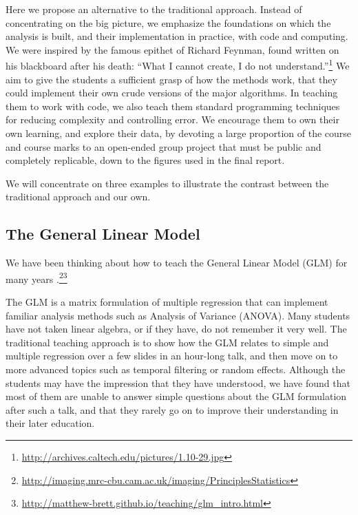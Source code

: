 Here we propose an alternative to the traditional approach.  Instead of
concentrating on the big picture, we emphasize the foundations on which the
analysis is built, and their implementation in practice, with code and
computing.  We were inspired by the famous epithet of Richard Feynman, found
written on his blackboard after his death: ``What I cannot create, I do not
understand.''\footnote{\url{http://archives.caltech.edu/pictures/1.10-29.jpg}}
We aim to give the students a sufficient grasp of how the methods work, that
they could implement their own crude versions of the major algorithms.  In
teaching them to work with code, we also teach them standard programming
techniques for reducing complexity and controlling error.  We encourage them
to own their own learning, and explore their data, by devoting a large
proportion of the course and course marks to an open-ended group project that
must be public and completely replicable, down to the figures used in the
final report.

We will concentrate on three examples to illustrate the contrast between the
traditional approach and our own.

\subsection{The General Linear Model}

We have been thinking about how to teach the General Linear Model (GLM) for
many years
\citep{poline2012general}.\footnote{\url{http://imaging.mrc-cbu.cam.ac.uk/imaging/PrinciplesStatistics}}\footnote{\label{glm_intro}
\url{http://matthew-brett.github.io/teaching/glm_intro.html}}

The GLM is a matrix formulation of multiple regression that can implement
familiar analysis methods such as Analysis of Variance (ANOVA).  Many students
have not taken linear algebra, or if they have, do not remember it very well.
The traditional teaching approach is to show how the GLM relates to simple and
multiple regression over a few slides in an hour-long talk, and then move on
to more advanced topics such as temporal filtering or random effects.
Although the students may have the impression that they have understood, we
have found that most of them are unable to answer simple questions about the
GLM formulation after such a talk, and that they rarely go on to improve their
understanding in their later education.

